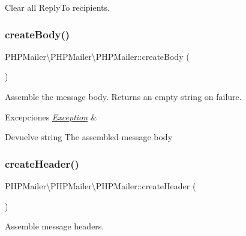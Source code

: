 Clear all Reply\+To recipients. \mbox{\label{classPHPMailer_1_1PHPMailer_1_1PHPMailer_a7a1ec44917d07353f39bec4b38e64879}} 
\subsubsection{\texorpdfstring{create\+Body()}{createBody()}}
{\footnotesize\ttfamily P\+H\+P\+Mailer\textbackslash{}\+P\+H\+P\+Mailer\textbackslash{}\+P\+H\+P\+Mailer\+::create\+Body (\begin{DoxyParamCaption}{ }\end{DoxyParamCaption})}

Assemble the message body. Returns an empty string on failure.


\begin{DoxyExceptions}{Excepciones}
{\em \hyperlink{classPHPMailer_1_1PHPMailer_1_1Exception}{Exception}} & \\
\hline
\end{DoxyExceptions}
\begin{DoxyReturn}{Devuelve}
string The assembled message body 
\end{DoxyReturn}
\mbox{\label{classPHPMailer_1_1PHPMailer_1_1PHPMailer_aabb26953f448e8f3eebfba873675f62b}} 
\subsubsection{\texorpdfstring{create\+Header()}{createHeader()}}
{\footnotesize\ttfamily P\+H\+P\+Mailer\textbackslash{}\+P\+H\+P\+Mailer\textbackslash{}\+P\+H\+P\+Mailer\+::create\+Header (\begin{DoxyParamCaption}{ }\end{DoxyParamCaption})}

Assemble message headers.

